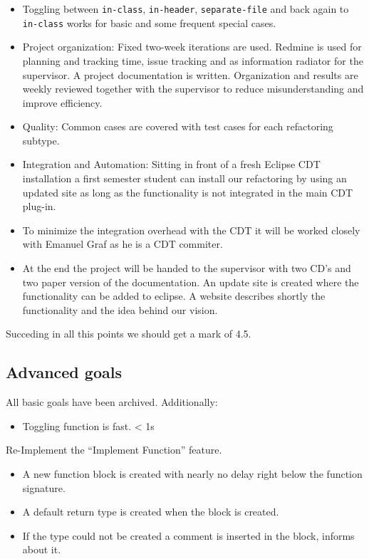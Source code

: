 \documentclass[a4paper,10pt]{scrreprt}
\begin{document}
\begin{itemize}
 \item Toggling between \texttt{in-class}, \texttt{in-header},
\texttt{separate-file} and back again to \texttt{in-class} works for basic and
some frequent special cases.
 \item Project organization: Fixed two-week iterations are used. Redmine is used
for planning and tracking time, issue tracking and as information radiator for
the supervisor. A project documentation is written. Organization and results are
weekly reviewed together with the supervisor to reduce misunderstanding and
improve efficiency.
 \item Quality: Common cases are covered with test cases for each
refactoring subtype.
 \item Integration and Automation: Sitting in front of a fresh Eclipse CDT
installation a first semester student can install our refactoring by using an
updated site as long as the functionality is not integrated in the main CDT
plug-in.
 \item To minimize the integration overhead with the CDT it will be worked
closely with Emanuel Graf as he is a CDT commiter.
 \item At the end the project will be handed to the supervisor with two CD's and
two paper version of the documentation. An update site is created where the
functionality can be added to eclipse. A website describes shortly the
functionality and the idea behind our vision.
\end{itemize}

Succeding in all this points we should get a mark of 4.5.

\subsection*{Advanced goals}
All basic goals have been archived. Additionally:\newline
\begin{itemize}
 \item Toggling function is fast. < 1s
\end{itemize}

Re-Implement the ``Implement Function'' feature.
\begin{itemize}
 \item A new function block is created with nearly no delay right below the
function signature.
 \item A default return type is created when the block is created.
 \item If the type could not be created a comment is inserted in the block,
informs about it.
\end{itemize}
\end{document}

